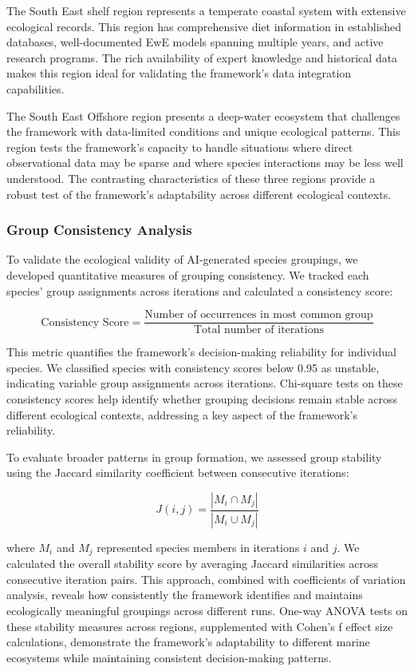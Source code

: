 The South East shelf region represents a temperate coastal system with extensive ecological records. This region has comprehensive diet information in established databases, well-documented EwE models spanning multiple years, and active research programs. The rich availability of expert knowledge and historical data makes this region ideal for validating the framework's data integration capabilities.

The South East Offshore region presents a deep-water ecosystem that challenges the framework with data-limited conditions and unique ecological patterns. This region tests the framework's capacity to handle situations where direct observational data may be sparse and where species interactions may be less well understood. The contrasting characteristics of these three regions provide a robust test of the framework's adaptability across different ecological contexts.


\subsubsection{Group Consistency Analysis}

To validate the ecological validity of AI-generated species groupings, we developed quantitative measures of grouping consistency. We tracked each species' group assignments across iterations and calculated a consistency score:

\[
\text{Consistency Score} = \frac{\text{Number of occurrences in most common group}}{\text{Total number of iterations}}
\]

This metric quantifies the framework's decision-making reliability for individual species. We classified species with consistency scores below 0.95 as unstable, indicating variable group assignments across iterations. Chi-square tests on these consistency scores help identify whether grouping decisions remain stable across different ecological contexts, addressing a key aspect of the framework's reliability.

To evaluate broader patterns in group formation, we assessed group stability using the Jaccard similarity coefficient between consecutive iterations:

\[
J(i,j) = \frac{|M_{i} \cap M_{j}|}{|M_{i} \cup M_{j}|}
\]

where $M_{i}$ and $M_{j}$ represented species members in iterations $i$ and $j$. We calculated the overall stability score by averaging Jaccard similarities across consecutive iteration pairs. This approach, combined with coefficients of variation analysis, reveals how consistently the framework identifies and maintains ecologically meaningful groupings across different runs. One-way ANOVA tests on these stability measures across regions, supplemented with Cohen's f effect size calculations, demonstrate the framework's adaptability to different marine ecosystems while maintaining consistent decision-making patterns.

